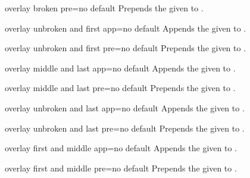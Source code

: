 \begin{docTcbKey}{overlay broken pre}{=}{no default}
  Prepends the given  to .
\end{docTcbKey}

\begin{docTcbKey}{overlay unbroken and first app}{=}{no default}
  Appends the given  to .
\end{docTcbKey}

\begin{docTcbKey}{overlay unbroken and first pre}{=}{no default}
  Prepends the given  to .
\end{docTcbKey}

\begin{docTcbKey}{overlay middle and last app}{=}{no default}
  Appends the given  to .
\end{docTcbKey}

\begin{docTcbKey}{overlay middle and last pre}{=}{no default}
  Prepends the given  to .
\end{docTcbKey}

\begin{docTcbKey}{overlay unbroken and last app}{=}{no default}
  Appends the given  to .
\end{docTcbKey}

\begin{docTcbKey}{overlay unbroken and last pre}{=}{no default}
  Prepends the given  to .
\end{docTcbKey}

\begin{docTcbKey}[][doc new=2014-09-19]{overlay first and middle app}{=}{no default}
  Appends the given  to .
\end{docTcbKey}

\begin{docTcbKey}[][doc new=2014-09-19]{overlay first and middle pre}{=}{no default}
  Prepends the given  to .
\end{docTcbKey}


